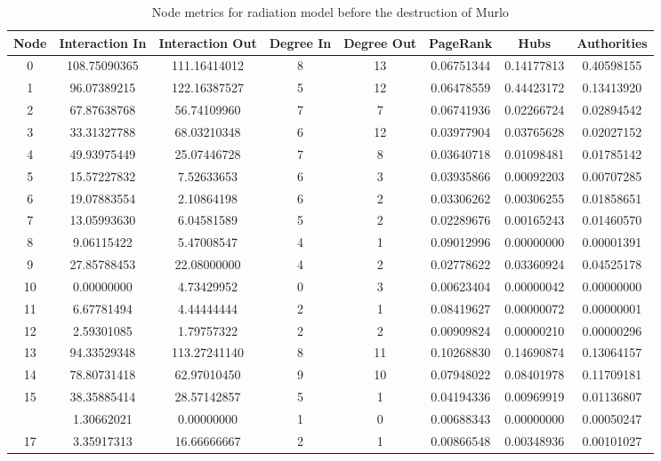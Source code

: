 \documentclass[12pt,a4paper]{thesis}
\begin{document}
\begin{table}[H]
\centering
\caption{Node metrics for radiation model before the destruction of Murlo}
\tiny
\begin{tabular}{|c|c|c|c|c|c|c|c|}
\hline	Node	&	Interaction In	&	Interaction Out	&	Degree In	&	Degree Out	&	PageRank	&	Hubs	&	Authorities	\\
\hline	0	&	108.75090365	&	111.16414012	&	8	&	13	&	0.06751344	&	0.14177813	&	0.40598155	\\
\hline	1	&	96.07389215	&	122.16387527	&	5	&	12 &	0.06478559	&	0.44423172	&	0.13413920	\\
\hline	2	&	67.87638768	&	56.74109960	&	7	&	7	&	0.06741936	&	0.02266724	&	0.02894542	\\
\hline	3	&	33.31327788	&	68.03210348	&	6	&	12	&	0.03977904	&	0.03765628	&	0.02027152	\\
\hline	4	&	49.93975449	&	25.07446728	&	7	&	8	&	0.03640718	&	0.01098481	&	0.01785142	\\
\hline	5	&	15.57227832	&	7.52633653	&	6	&	3	&	0.03935866	&	0.00092203	&	0.00707285	\\
\hline	6	&	19.07883554	&	2.10864198	&	6	&	2	&	0.03306262	&	0.00306255	&	0.01858651	\\
\hline	7	&	13.05993630	&	6.04581589	&	5	&	2	&	0.02289676	&	0.00165243	&	0.01460570	\\
\hline	8	&	9.06115422	&	5.47008547	&	4	&	1	&	0.09012996	&	0.00000000	&	0.00001391	\\
\hline	9	&	27.85788453	&	22.08000000	&	4	&	2	&	0.02778622	&	0.03360924	&	0.04525178	\\
\hline	10	&	0.00000000	&	4.73429952	&	0	&	3	&	0.00623404	&	0.00000042	&	0.00000000	\\
\hline	11	&	6.67781494	&	4.44444444	&	2	&	1	&	0.08419627	&	0.00000072	&	0.00000001	\\
\hline	12	&	2.59301085	&	1.79757322	&	2	&	2	&	0.00909824	&	0.00000210	&	0.00000296	\\
\hline	13	&	94.33529348	&	113.27241140	&	8	&	11	&	0.10268830	&	0.14690874	&	0.13064157	\\
\hline	14	&	78.80731418	&	62.97010450	&	9	&	10	&	0.07948022	&	0.08401978	&	0.11709181	\\
\hline	15	&	38.35885414	&	28.57142857	&	5	&	1	&	0.04194336	&	0.00969919	&	0.01136807	\\
\rowcolor{yellow}
\hline	16	&	1.30662021	&	0.00000000	&	1	&	0	&	0.00688343	&	0.00000000	&	0.00050247	\\
\hline	17	&	3.35917313	&	16.66666667	&	2	&	1	&	0.00866548	&	0.00348936	&	0.00101027	\\

\end{tabular}
\end{table}
\end{document}
